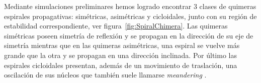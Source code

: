 Mediante simulaciones preliminares hemos logrado encontrar 3 clases de quimeras espirales propagativas: simétricas, asimétricas y cicloidales, junto con su región de estabilidad correspondiente, ver figura~\ref{fig:SpiralChimera}. Las quimeras simétricas poseen simetría de reflexión y se propagan en la dirección de su eje de simetría mientras que en las quimeras asimétricas, una espiral se vuelve más grande que la otra y se propagan en una dirección inclinada. Por último las espirales cicloidales presentan, además de un movimiento de traslación, una oscilación de sus núcleos que también suele llamarse {\em meandering} \cite{SC:Bataille}.